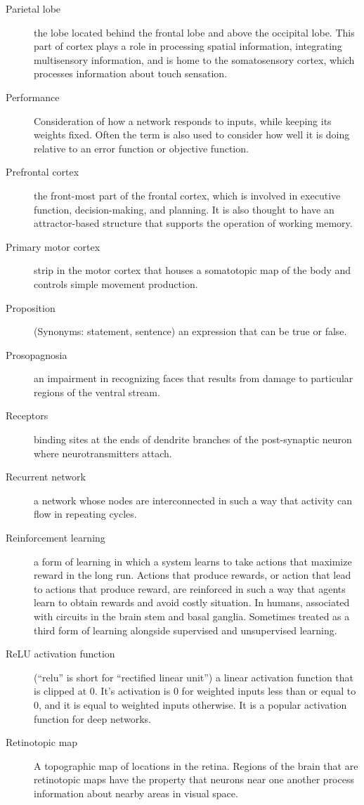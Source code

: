 \begin{description}
\item[Parietal lobe] the lobe located behind the frontal lobe and above the occipital lobe. This part of cortex plays a role in processing spatial information, integrating multisensory information, and is home to the somatosensory cortex, which processes information about touch sensation.
\item[Performance] Consideration of how a network responds to inputs, while keeping its weights fixed.  Often the term is also used to consider how well it is doing relative to an error function or objective function.
\item[Prefrontal cortex] the front-most part of the frontal cortex, which is involved in executive function, decision-making, and planning. It is also thought to have an attractor-based structure that supports the operation of working memory.
\item[Primary motor cortex] strip in the motor cortex that houses a somatotopic map of the body and controls simple movement production. 
\item[Proposition]  (Synonyms: statement, sentence) an expression that can be true or false.
\item[Prosopagnosia] an impairment in recognizing faces that results from damage to particular regions of the ventral stream.
\item[Receptors] binding sites at the ends of dendrite branches of the post-synaptic neuron where neurotransmitters attach.
\item[Recurrent network] a network whose nodes are interconnected in such a way that activity can flow in repeating cycles.
\item[Reinforcement learning] a form of learning in which a system learns to take actions that maximize reward in the long run.   Actions that produce rewards, or action that lead to actions that produce reward, are reinforced in such a way that agents learn to obtain rewards and avoid costly situation.  In humans, associated with circuits in the brain stem and basal ganglia.  Sometimes treated as a third form of learning alongside supervised and unsupervised learning.
\item[ReLU activation function] (``relu'' is short for ``rectified linear unit'') a linear activation function that is clipped at  0. It's activation is 0 for weighted inputs less than or equal to 0, and it is equal to weighted inputs otherwise. It is a popular activation function for deep networks.
\item[Retinotopic map] A topographic map of locations in the retina. Regions of the brain that are retinotopic maps have the property that neurons near one another process information about nearby areas in visual space.

\end{description}
